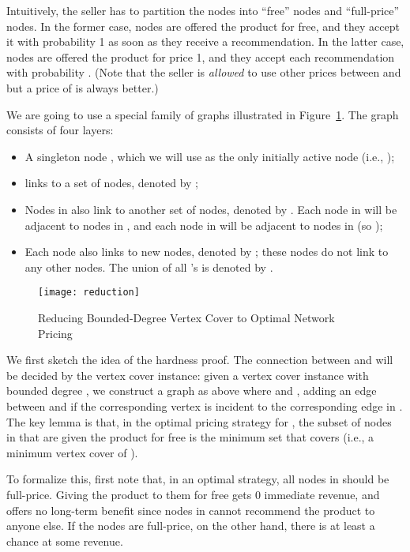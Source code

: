 \documentclass[letterpaper,twoside]{article}
\begin{document}
Intuitively, the seller has to partition the nodes into ``free''
nodes and ``full-price'' nodes. In the former case, nodes are offered
the product for free, and they accept it with probability 1 as soon
as they receive a recommendation. In the latter case, nodes are
offered the product for price 1, and they accept each recommendation
with probability . (Note that the seller is {\em allowed} to use
other prices between  and  but a price of  is always
better.)

We are going to use a special family of graphs illustrated in
Figure~\ref{fig:reduction}. The graph consists of four layers:
\begin{itemize}
\item A singleton node , which we will use as the only initially
  active node (i.e., );
\item  links to a set of  nodes, denoted by ;
\item Nodes in  also link to another set of nodes, denoted by .
Each node in  will be adjacent to  nodes in , and each
node in  will be adjacent to  nodes in  (so
);
\item Each node  also links to  new nodes, denoted by
; these  nodes do not link to any other nodes. The union of
all 's is denoted by .
\end{itemize}

\begin{figure}[htpb]
  \centering
  \texttt{[image: reduction]}
  \caption{Reducing Bounded-Degree Vertex Cover to Optimal Network Pricing}
  \label{fig:reduction}
\end{figure}

We first sketch the idea of the hardness proof. The connection
between  and  will be decided by the vertex cover
instance: given a vertex cover instance  with bounded
degree , we construct a graph  as above where  and
, adding an edge between  and  if the corresponding
vertex is incident to the corresponding edge in . The key lemma
is that, in the optimal pricing strategy for , the subset of nodes
in  that are given the product for free is the minimum set that
covers  (i.e., a minimum vertex cover of ).

To formalize this, first note that, in an optimal strategy, all nodes
in  should be full-price. Giving the product to them for free
gets 0 immediate revenue, and offers no long-term benefit since nodes
in  cannot recommend the product to anyone else. If the nodes
are full-price, on the other hand, there is at least a chance at
some revenue.
\end{document}

